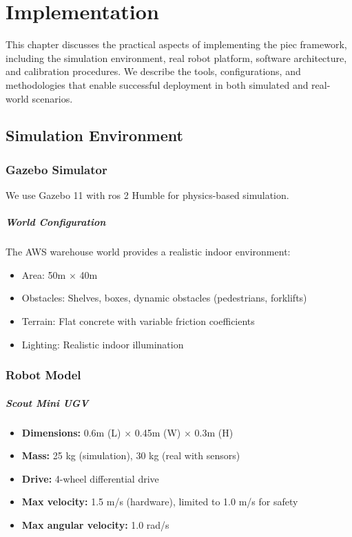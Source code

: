 \chapter{Implementation}
\label{ch:implementation}

This chapter discusses the practical aspects of implementing the \acrshort{piec} framework, including the simulation environment, real robot platform, software architecture, and calibration procedures. We describe the tools, configurations, and methodologies that enable successful deployment in both simulated and real-world scenarios.

\section{Simulation Environment}
\label{sec:impl_simulation}

\subsection{Gazebo Simulator}

We use Gazebo 11 with \acrshort{ros} 2 Humble for physics-based simulation.

\paragraph{World Configuration}
The AWS warehouse world provides a realistic indoor environment:
\begin{itemize}
    \item Area: 50m $\times$ 40m
    \item Obstacles: Shelves, boxes, dynamic obstacles (pedestrians, forklifts)
    \item Terrain: Flat concrete with variable friction coefficients
    \item Lighting: Realistic indoor illumination
\end{itemize}


\subsection{Robot Model}

\paragraph{Scout Mini UGV}
\begin{itemize}
    \item \textbf{Dimensions:} 0.6m (L) $\times$ 0.45m (W) $\times$ 0.3m (H)
    \item \textbf{Mass:} 25 kg (simulation), 30 kg (real with sensors)
    \item \textbf{Drive:} 4-wheel differential drive
    \item \textbf{Max velocity:} 1.5 m/s (hardware), limited to 1.0 m/s for safety
    \item \textbf{Max angular velocity:} 1.0 rad/s
\end{itemize}

